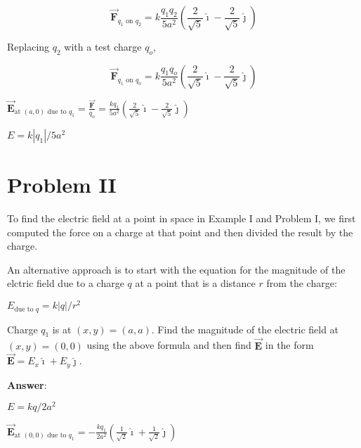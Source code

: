 \documentclass{article}
\newcommand{\ds}[0]{\displaystyle}
\newcommand{\ihat}[0]{\hat{\boldsymbol{\imath}}}
\newcommand{\jhat}[0]{\hat{\boldsymbol{\jmath}}}
\newcommand{\bfvec}[1]{\vec{\mathbf{#1}}}
\begin{document}
$$\bfvec{F}_{q_1\text{ on } q_2}=k\frac{q_1q_2}{5a^2}\left(\frac{2}{\sqrt{5}}\ihat -\frac{2}{\sqrt{5}}\jhat\right)$$

Replacing $q_2$ with a test charge $q_o$,

$$\bfvec{F}_{q_1\text{ on } q_o}=k\frac{q_1q_o}{5a^2}\left(\frac{2}{\sqrt{5}}\ihat -\frac{2}{\sqrt{5}}\jhat\right)$$

$\ds\bfvec{E}_{\text{at }(a,0) \text{ due to }q_1} = \frac{\bfvec{F}}{q_o}=\frac{kq_1}{5a^2}\left(\frac{2}{\sqrt{5}}\ihat -\frac{2}{\sqrt{5}}\jhat\right)$

$E = k|q_1|/5a^2$
\fi

\newpage

\section{Problem II}

To find the electric field at a point in space in Example I and Problem I, we first computed the force on a charge at that point and then divided the result by the charge.

An alternative approach is to start with the equation for the magnitude of the elctric field due to a charge $q$ at a point that is a distance $r$ from the charge:

$E_{\text{due to }q}=k{|q|}/{r^2}$

Charge $q_1$ is at $(x,y)=(a, a)$. Find the magnitude of the electric field at $(x,y)=(0, 0)$ using the above formula and then find $\bfvec{E}$ in the form $\bfvec{E}=E_x\ihat + E_y\jhat$.



\ifsolutions
{\bf Answer}:

$E = kq/2a^2$

$\ds\bfvec{E}_{\text{at }(0,0) \text{ due to }q_1}=-\frac{kq_1}{2a^2}\left(\frac{1}{\sqrt{2}}\ihat +\frac{1}{\sqrt{2}}\jhat\right)$
\fi
\end{document}
